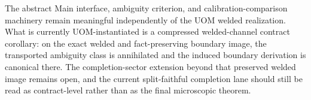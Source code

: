 \begin{remark}
The abstract Main interface, ambiguity criterion, and calibration-comparison machinery remain meaningful independently of the UOM welded realization. What is currently UOM-instantiated is a compressed welded-channel contract corollary: on the exact welded and fact-preserving boundary image, the transported ambiguity class is annihilated and the induced boundary derivation is canonical there. The completion-sector extension beyond that preserved welded image remains open, and the current split-faithful completion lane should still be read as contract-level rather than as the final microscopic theorem.
\end{remark}